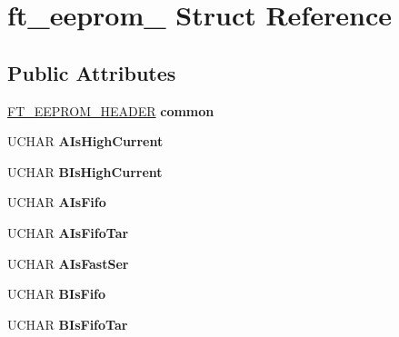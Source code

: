 \hypertarget{structft__eeprom__2232}{}\section{ft\+\_\+eeprom\+\_ Struct Reference}
\label{structft__eeprom__2232}
\subsection*{Public Attributes}
\begin{DoxyCompactItemize}
\item 
\hyperlink{structft__eeprom__header}{F\+T\+\_\+\+E\+E\+P\+R\+O\+M\+\_\+\+H\+E\+A\+D\+ER} {\bfseries common}\hypertarget{structft__eeprom__2232_a6b294dc09899eb022f2e949b3d5c4972}{}\label{structft__eeprom__2232_a6b294dc09899eb022f2e949b3d5c4972}

\item 
U\+C\+H\+AR {\bfseries A\+Is\+High\+Current}\hypertarget{structft__eeprom__2232_a66f55cd8947dc7015515038a35495ddc}{}\label{structft__eeprom__2232_a66f55cd8947dc7015515038a35495ddc}

\item 
U\+C\+H\+AR {\bfseries B\+Is\+High\+Current}\hypertarget{structft__eeprom__2232_a2d7b4af1ab0e3b0084e13b83f513b5d5}{}\label{structft__eeprom__2232_a2d7b4af1ab0e3b0084e13b83f513b5d5}

\item 
U\+C\+H\+AR {\bfseries A\+Is\+Fifo}\hypertarget{structft__eeprom__2232_acf4ea789894df80107249291ac055a6f}{}\label{structft__eeprom__2232_acf4ea789894df80107249291ac055a6f}

\item 
U\+C\+H\+AR {\bfseries A\+Is\+Fifo\+Tar}\hypertarget{structft__eeprom__2232_a6b3aab2f52076295cc32a5a785194b78}{}\label{structft__eeprom__2232_a6b3aab2f52076295cc32a5a785194b78}

\item 
U\+C\+H\+AR {\bfseries A\+Is\+Fast\+Ser}\hypertarget{structft__eeprom__2232_acbcbf6335afad8a22eac6a575f385785}{}\label{structft__eeprom__2232_acbcbf6335afad8a22eac6a575f385785}

\item 
U\+C\+H\+AR {\bfseries B\+Is\+Fifo}\hypertarget{structft__eeprom__2232_a090431f3dee969f1fd88cf30aabffe2f}{}\label{structft__eeprom__2232_a090431f3dee969f1fd88cf30aabffe2f}

\item 
U\+C\+H\+AR {\bfseries B\+Is\+Fifo\+Tar}\hypertarget{structft__eeprom__2232_a576a9319f978ff28d3bb0a042d6196a8}{}\label{structft__eeprom__2232_a576a9319f978ff28d3bb0a042d6196a8}


\end{DoxyCompactItemize}
